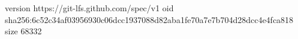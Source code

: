 version https://git-lfs.github.com/spec/v1
oid sha256:6c52c34af03956930c06dcc1937088d82aba1fe70a7e7b704d28dcc4e4fca818
size 68332
